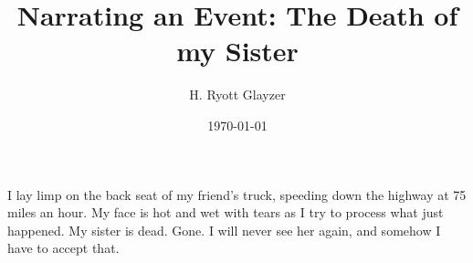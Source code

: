 \documentclass[12pt, letterpaper]{article}
\title{Narrating an Event: The Death of my Sister}
\author{H. Ryott Glayzer}
\date{\today}
\begin{document}
\maketitle


I lay limp on the back seat of my friend's truck,
speeding down the highway at 75 miles an hour.
My face is hot and wet with tears as I try to process what just happened.
My sister is dead.
Gone.
I will never see her again, and somehow I have to accept that.
\end{document}
